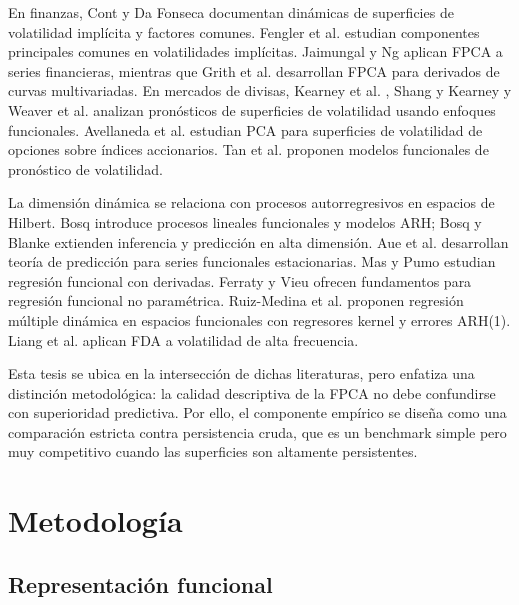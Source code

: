\documentclass[12pt,a4paper]{article}
\begin{document}
En finanzas, Cont y Da Fonseca \cite{ContDaFonseca2002} documentan dinámicas de superficies de volatilidad implícita y factores comunes. Fengler et al. \cite{Fengler2003} estudian componentes principales comunes en volatilidades implícitas. Jaimungal y Ng \cite{JaimungalNg2007} aplican FPCA a series financieras, mientras que Grith et al. \cite{Grith2018} desarrollan FPCA para derivados de curvas multivariadas. En mercados de divisas, Kearney et al. \cite{Kearney2018}, Shang y Kearney \cite{ShangKearney2022} y Weaver et al. \cite{Weaver2020} analizan pronósticos de superficies de volatilidad usando enfoques funcionales. Avellaneda et al. \cite{Avellaneda2020} estudian PCA para superficies de volatilidad de opciones sobre índices accionarios. Tan et al. \cite{Tan2024} proponen modelos funcionales de pronóstico de volatilidad.

La dimensión dinámica se relaciona con procesos autorregresivos en espacios de Hilbert. Bosq \cite{Bosq2000} introduce procesos lineales funcionales y modelos ARH; Bosq y Blanke \cite{BosqBlanke2007} extienden inferencia y predicción en alta dimensión. Aue et al. \cite{Aue2015} desarrollan teoría de predicción para series funcionales estacionarias. Mas y Pumo \cite{MasPumo2009} estudian regresión funcional con derivadas. Ferraty y Vieu \cite{FerratyVieu2006} ofrecen fundamentos para regresión funcional no paramétrica. Ruiz-Medina et al. \cite{RuizMedina2019} proponen regresión múltiple dinámica en espacios funcionales con regresores kernel y errores ARH(1). Liang et al. \cite{Liang2022} aplican FDA a volatilidad de alta frecuencia.

Esta tesis se ubica en la intersección de dichas literaturas, pero enfatiza una distinción metodológica: la calidad descriptiva de la FPCA no debe confundirse con superioridad predictiva. Por ello, el componente empírico se diseña como una comparación estricta contra persistencia cruda, que es un benchmark simple pero muy competitivo cuando las superficies son altamente persistentes.

\section{Metodología}

\subsection{Representación funcional}
\end{document}
